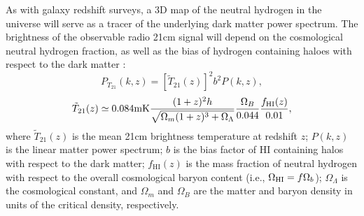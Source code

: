 \documentclass[10pt,iop]{emulateapj}
\begin{document}
As with galaxy redshift surveys, a 3D map of the neutral hydrogen in the universe
will serve as a tracer of the underlying dark matter power spectrum.  The brightness 
of the observable radio 21cm signal will depend on the cosmological neutral hydrogen
fraction, as well as the bias of hydrogen containing haloes with respect to the dark matter
\citep{barkana_and_loeb_2007,madau_et_al_1997,ansari_et_al_2012b}:
\begin{equation}
    \label{eq:pred_sig_b}
    P_{T_{21}}(k,z) = \left[\tilde T_{21}(z)\right]^2 b^2 P(k,z),
\end{equation}
\begin{align}
    \label{eq:pred_sig_fhi}
    \tilde T_{21}(z) \simeq 0.084 {\rm mK} \frac{(1+z)^2 h}{\sqrt{\Omega_m(1+z)^3+\Omega_\Lambda}} \frac{\Omega_B}{0.044}\frac{f_{\rm{HI}}(z)}{0.01},
\end{align}
where $\tilde T_{21}(z)$ is the mean 21cm brightness temperature at
redshift $z$; $P(k,z)$ is the linear matter power spectrum; $b$ is the
bias factor of HI containing halos with respect to the dark matter;
$f_{\mathrm{HI}}(z)$ is the mass fraction of neutral hydrogen with
respect to the overall cosmological baryon content (i.e., $\Omega_{\rm{HI}} = f\Omega_b$); $\Omega_\Lambda$
is the cosmological constant, and $\Omega_m$ and $\Omega_B$ are the
matter and baryon density in units of the critical density,
respectively.
\end{document}
